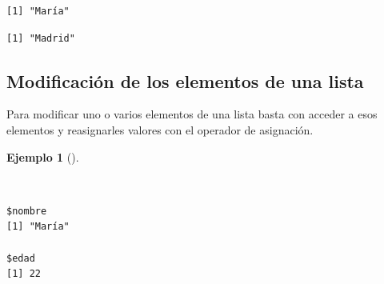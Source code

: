 \documentclass[
  spanish,
  a4paper,
]{scrreport}
\newenvironment{Shaded}{\begin{snugshade}}{\end{snugshade}}
\newcommand{\CommentTok}[1]{\textcolor[rgb]{0.37,0.37,0.37}{#1}}
\newcommand{\DecValTok}[1]{\textcolor[rgb]{0.68,0.00,0.00}{#1}}
\newcommand{\FunctionTok}[1]{\textcolor[rgb]{0.28,0.35,0.67}{#1}}
\newcommand{\NormalTok}[1]{\textcolor[rgb]{0.00,0.23,0.31}{#1}}
\newcommand{\OtherTok}[1]{\textcolor[rgb]{0.00,0.23,0.31}{#1}}
\newcommand{\SpecialCharTok}[1]{\textcolor[rgb]{0.37,0.37,0.37}{#1}}
\newcommand{\StringTok}[1]{\textcolor[rgb]{0.13,0.47,0.30}{#1}}
\theoremstyle{definition}
\theoremstyle{definition}
\newtheorem{example}{Ejemplo}[chapter]
\theoremstyle{remark}
\begin{document}
\begin{Shaded}
\end{Shaded}

\begin{verbatim}
[1] "María"
\end{verbatim}

\begin{Shaded}
\end{Shaded}

\begin{verbatim}
[1] "Madrid"
\end{verbatim}

\subsection{Modificación de los elementos de una
lista}\label{modificaciuxf3n-de-los-elementos-de-una-lista}

Para modificar uno o varios elementos de una lista basta con acceder a
esos elementos y reasignarles valores con el operador de asignación.

\begin{example}[]\protect\hypertarget{exm-modificacion-listas}{}\label{exm-modificacion-listas}

~

\begin{Shaded}
\end{Shaded}

\begin{verbatim}
$nombre
[1] "María"

$edad
[1] 22
\end{verbatim}

\end{example}
\end{document}

